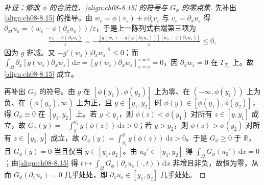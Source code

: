 \documentclass[../../main.tex]{subfiles}%
\begin{document}
\begin{proof}[补证：修改 $\phi$ 的合法性、\eqref{align:ch08-8.15} 的符号与 $G_\phi$ 的零点集]
先补出\eqref{align:ch08-8.15} 的推导。由 $w_\varepsilon=\phi(v_\varepsilon)+\varepsilon\partial_tv_\varepsilon$ 与 $v_\varepsilon=\partial_xu_\varepsilon$ 得 $\partial_{xt}u_\varepsilon=(w_\varepsilon-\phi(\partial_xu_\varepsilon))/\varepsilon$，于是上一陈列式右端第三项为
\begin{align*}
[g(\phi(\partial_xu_\varepsilon))-g(w_\varepsilon)]\frac{w_\varepsilon-\phi(\partial_xu_\varepsilon)}{\varepsilon}
=-\frac{[g(w_\varepsilon)-g(\phi(\partial_xu_\varepsilon))][w_\varepsilon-\phi(\partial_xu_\varepsilon)]}{\varepsilon}\leqslant0,
\end{align*}
因为 $g$ 非减。又 $-g'(w_\varepsilon)|\partial_xw_\varepsilon|^2\leqslant0$；而 $\int_\Omega\partial_x[g(w_\varepsilon)\partial_xw_\varepsilon]\,\mathrm{d}x=[g(w_\varepsilon)\partial_xw_\varepsilon]_{x=a}^{x=b}=0$，因 $\partial_xw_\varepsilon=0$ 在 $\Gamma_{T_\varepsilon}$ 上。故\eqref{align:ch08-8.15} 成立。

再补出 $G_\phi$ 的符号。由 $g$ 在 $[\phi(y_1),\phi(y_2)]$ 上为零、在 $(-\infty,\phi(y_1))$ 上为负、在 $(\phi(y_2),\infty)$ 上为正，且 $y\in[y_1,y_2]$ 时 $\phi(y)\in[\phi(y_1),\phi(y_2)]$，得 $G_\phi\equiv0$ 在 $[y_1,y_2]$ 上。若 $y<y_1$，则 $\phi(z)<\phi(y_1)$ 对所有 $z\in[y,y_1]$ 成立，故 $G_\phi(y)=-\int_y^{y_1}g(\phi(z))\,\mathrm{d}z>0$；若 $y>y_2$，则 $\phi(z)>\phi(y_2)$ 对所有 $z\in[y_2,y]$ 成立，故 $G_\phi(y)=\int_{y_2}^yg(\phi(z))\,\mathrm{d}z>0$。于是 $G_\phi\geqslant0$ 于 $\mathbb{R}$，且 $G_\phi(y)=0$ 当且仅当 $y\in[y_1,y_2]$。由 $u_0'\in[y_1,y_2]$ 得 $\int_\Omega G_\phi(u_0')\,\mathrm{d}x=0$；由\eqref{align:ch08-8.15} 得 $t\mapsto\int_\Omega G_\phi(\partial_xu_\varepsilon(\cdot,t))\,\mathrm{d}x$ 非增且非负，故恒为零，从而 $G_\phi(\partial_xu_\varepsilon)=0$ 几乎处处，即 $\partial_xu_\varepsilon\in[y_1,y_2]$ 几乎处处。


\end{proof}
\end{document}
